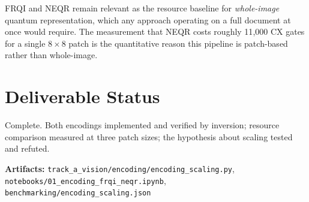\documentclass[11pt,a4paper]{article}
\begin{document}
FRQI and NEQR remain relevant as the resource baseline for \emph{whole-image}
quantum representation, which any approach operating on a full document at once
would require. The measurement that NEQR costs roughly 11{,}000 CX gates for a
single $8\times8$ patch is the quantitative reason this pipeline is patch-based
rather than whole-image.

\section{Deliverable Status}

Complete. Both encodings implemented and verified by inversion; resource
comparison measured at three patch sizes; the hypothesis about scaling tested and
refuted.

\vspace{0.3cm}
\noindent\textbf{Artifacts:} \texttt{track\_a\_vision/encoding/encoding\_scaling.py},
\texttt{notebooks/01\_encoding\_frqi\_neqr.ipynb},
\texttt{benchmarking/encoding\_scaling.json}
\end{document}
